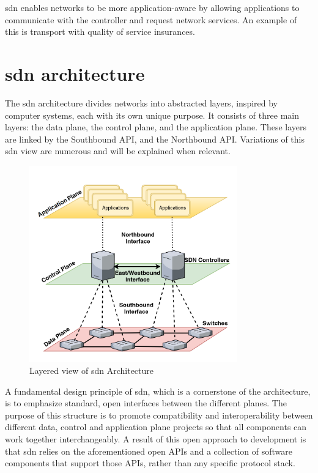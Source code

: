 \gls{sdn} enables networks to be more application-aware by allowing applications to communicate with the controller and request network services\cite{thyagaturu_software_2016}. An example of this is transport with quality of service insurances. 


\section[SDN architecture]{\gls{sdn} architecture} %
\label{sec:sdn_arch}

The \gls{sdn} architecture divides networks into abstracted layers, inspired by computer systems, each with its own unique purpose\cite{kreutz_software-defined_2015}. It consists of three main layers: the data plane, the control plane, and the application plane. These layers are linked by the Southbound API, and the Northbound API. Variations of this \gls{sdn} view are numerous and will be explained when relevant.

\begin{figure}
	\centering
	\includegraphics[width=0.8\textwidth]{Chapters/Figures/SDNs/LAYERS.png}
	\caption{Layered view of \gls{sdn} Architecture\cite{latif_comprehensive_2020}}
	\label{fig:sdn_layers}
\end{figure}

A fundamental design principle of \gls{sdn}, which is a cornerstone of the architecture, is to emphasize standard, open interfaces between the different planes. The purpose of this structure is to promote compatibility and interoperability between different data, control and application plane projects so that all components can work together interchangeably\cite{kreutz_software-defined_2015}. A result of this open approach to development is that \gls{sdn} relies on the aforementioned open APIs and a collection of software components that support those APIs, rather than any specific protocol stack\cite{peterson_software-defined_2021}. 


